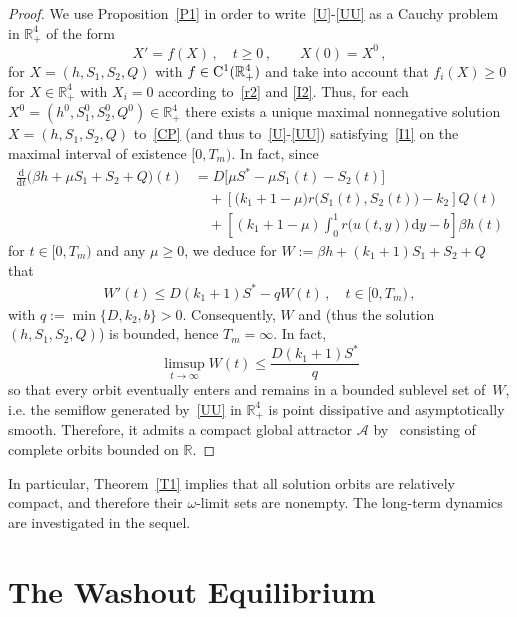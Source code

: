 \documentclass[reqno,11pt]{amsart}
\numberwithin{equation}{section}
\newcommand{\R}{\mathbb{R}}
\newcommand{\rd}{\mathrm{d}}
\begin{document}
\begin{proof} 
We use Proposition~\ref{P1} in order to write~\eqref{U}-\eqref{UU} as a Cauchy problem in $\R_+^4$ of the form 
\begin{equation}\label{CP}
X'=f(X)\,,\quad t \ge 0\,,\qquad X(0)=X^0\,,
\end{equation} 
for $X=(h,S_1,S_2,Q)$ with $f\in{\rm C}^1(\R_+^4)$ and take into account that $f_i(X)\ge 0$ for $X\in \R_+^4$ with $X_i=0$ according to~\eqref{r2} and \eqref{I2}. Thus, for each $X^0=(h^0, S_1^0,S_2^0, Q^0)\in \R_+^4$ there exists a unique maximal nonnegative solution \mbox{$X=(h,S_1,S_2,Q)$} to~\eqref{CP} (and thus to~\eqref{U}-\eqref{UU}) satisfying~\eqref{I1} on the maximal interval of existence $[0,T_m)$. In fact, since
\begin{align*}
\frac{\rd}{\rd t}\big(\beta h+\mu S_1+S_2+Q\big)(t)&= D\big[\mu S^*-\mu S_1(t)-S_2(t)\big]\\
&\quad  +
\left[\big(k_1 +1-\mu\big) r\big(S_1(t),S_2(t)\big)-k_2\right]Q(t)\\
&\quad 
+\left[(k_1+1-\mu)\int_0^1 r\bigl(u(t,y)\bigr)\,\rd y-b\right]\beta h(t)
\end{align*}
for $t\in [0,T_m)$ and any $\mu\ge 0$, we deduce for $W:=\beta h+(k_1+1)S_1+S_2+Q$ that 
\begin{align}\label{W}
W'(t)\le D(k_1+1)S^*- qW(t)\,,\quad t\in [0,T_m)\,,
\end{align}
with $q:=\min\{D,k_2,b\}>0$. Consequently, $W$ and (thus the solution $(h,S_1,S_2,Q)$) is bounded, hence $T_m=\infty$. In fact,
\begin{equation}\label{Wbound}
\limsup_{t\to\infty}W(t)\le \frac{D(k_1+1)S^*}{q}
\end{equation}
so that  
every orbit eventually enters and remains in a bounded sublevel set of~$W$, i.e. the semiflow generated by~\eqref{UU} in $\R_+^4$ is point dissipative and asymptotically smooth. Therefore, it admits a compact global attractor $\mathcal{A}$ by~\cite[Theorem~3.4.6]{Hale1988} consisting of complete orbits bounded on $\R$.



\end{proof}

In particular, Theorem~\ref{T1} implies that all solution orbits are relatively compact, and therefore their $\omega$-limit sets are nonempty. The long-term dynamics are investigated in the sequel.



\section{The Washout Equilibrium}\label{Sec3}
\end{document}
